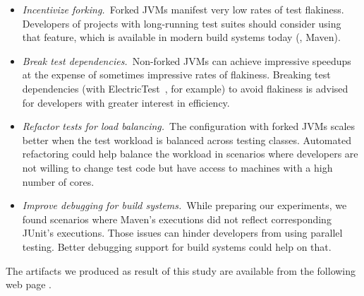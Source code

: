 \documentclass[10pt,journal,compsoc]{IEEEtran}
\begin{document}
\begin{itemize}
\item \emph{Incentivize forking.}~Forked JVMs manifest very low rates
  of test flakiness.  Developers of projects with long-running test
  suites should consider using that feature, which is available in
  modern build systems today (\eg{}, Maven).
\item \emph{Break test dependencies.}~Non-forked JVMs can achieve
  impressive speedups at the expense of sometimes impressive rates of
  flakiness.  Breaking test dependencies (with
  ElectricTest~\cite{bell-etal-esecfse2015}, for example) to avoid flakiness is advised for developers with
  greater interest in efficiency.
\item \emph{Refactor tests for load balancing.}~The configuration with
  forked JVMs scales
  better when the test workload is balanced
  across testing classes.  Automated refactoring could help balance
  the workload in scenarios where developers are not willing to change
  test code but have access to machines with a high number of cores.
\item \emph{Improve debugging for build systems.}~While preparing our
  experiments, we found scenarios where Maven's executions did not reflect
  corresponding JUnit's executions. Those issues can hinder developers from using parallel
  testing. Better debugging support for build systems could help
  on that. 
\end{itemize}

The artifacts we produced as result of this study are available from
the following web page \webpage{}.



\end{document}
